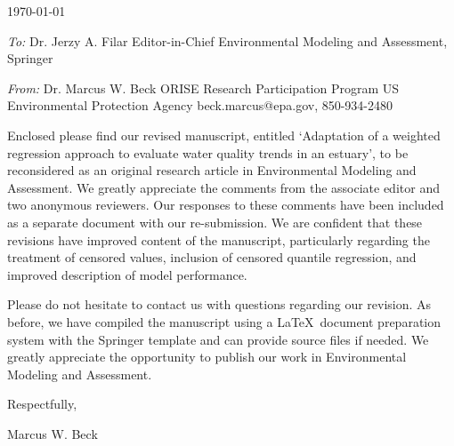\documentclass[a4paper,12pt]{article}
\begin{document}
\renewcommand{\rmdefault}{ptm}
\pagestyle{empty} 

\setlength{\parindent}{0mm} 
\setlength{\parskip}{5mm}

\begin{flushright}
\today
\end{flushright}

\vfill

\emph{To:}\newline
Dr. Jerzy A. Filar\newline
Editor-in-Chief\newline
Environmental Modeling and Assessment, Springer

\emph{From:}\newline
Dr. Marcus W. Beck\newline
ORISE Research Participation Program\newline
US Environmental Protection Agency\newline
beck.marcus@epa.gov, 850-934-2480\vspace{14.5pt}

Enclosed please find our revised manuscript, entitled `Adaptation of a weighted regression approach to evaluate water quality trends in an estuary', to be reconsidered as an original research article in Environmental Modeling and Assessment.  We greatly appreciate the comments from the associate editor and two anonymous reviewers.  Our responses to these comments have been included as a separate document with our re-submission.  We are confident that these revisions have improved content of the manuscript, particularly regarding the treatment of censored values, inclusion of censored quantile regression, and improved description of model performance.  

Please do not hesitate to contact us with questions regarding our revision.  As before, we have compiled the manuscript using a \LaTeX\ document preparation system with the Springer template and can provide source files if needed.  We greatly appreciate the opportunity to publish our work in Environmental Modeling and Assessment.\vspace{0.5in}

\hspace{4.5in}Respectfully,

\hspace{4.5in}Marcus W. Beck

\vfill
\end{document}

